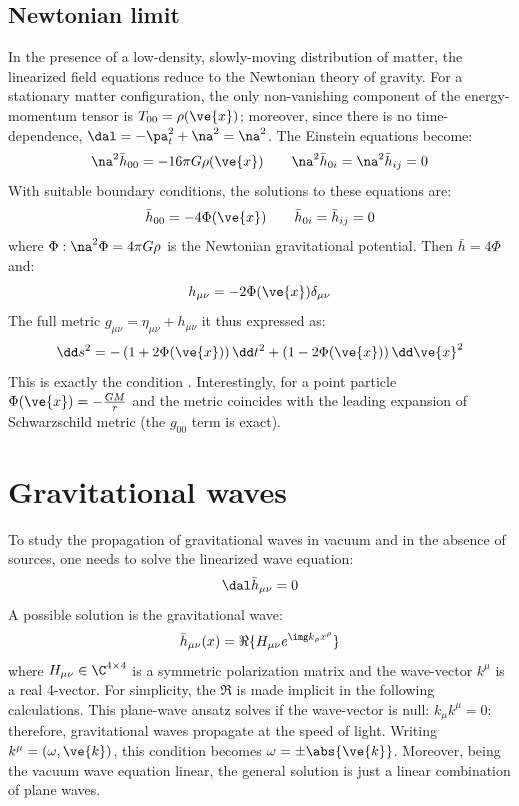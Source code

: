 \subsection{Newtonian limit}

In the presence of a low-density, slowly-moving distribution of matter, the linearized field equations reduce to the Newtonian theory of gravity. For a stationary matter configuration, the only non-vanishing component of the energy-momentum tensor is $ T_{00} = \rho(\ve{x}) $; moreover, since there is no time-dependence, $ \dal = -\pa_t^2 + \na^2 = \na^2 $. The Einstein equations become:
\begin{equation*}
  \na^2 \bar{h}_{00} = -16\pi G \rho(\ve{x})
  \qquad
  \na^2 \bar{h}_{0i} = \na^2 \bar{h}_{ij} = 0
\end{equation*}
With suitable boundary conditions, the solutions to these equations are:
\begin{equation*}
  \bar{h}_{00} = -4 \Phi(\ve{x})
  \qquad
  \bar{h}_{0i} = \bar{h}_{ij} = 0
\end{equation*}
where $ \Phi : \na^2 \Phi = 4\pi G \rho $ is the Newtonian gravitational potential. Then $ \bar{h} = 4 \Phi $ and:
\begin{equation*}
  h_{\mu \nu} = -2\Phi(\ve{x}) \delta_{\mu \nu}
\end{equation*}
The full metric $ g_{\mu \nu} = \eta_{\mu \nu} + h_{\mu \nu} $ it thus expressed as:
\begin{equation}
  \dd s^2 = - \left( 1 + 2\Phi(\ve{x}) \right) \dd t^2 + \left( 1 - 2\Phi(\ve{x}) \right) \dd\ve{x}^2
  \label{eq:linear-newtonian}
\end{equation}
This is exactly the condition .
Interestingly, for a point particle $ \Phi(\ve{x}) = - \frac{GM}{r} $ and the metric coincides with the leading expansion of Schwarzschild metric (the $ g_{00} $ term is exact).

\newpage
\section{Gravitational waves}

To study the propagation of gravitational waves in vacuum and in the absence of sources, one needs to solve the linearized wave equation:
\begin{equation}
  \dal \bar{h}_{\mu \nu} = 0
  \label{eq:wave}
\end{equation}
A possible solution is the gravitational wave:
\begin{equation}
  \bar{h}_{\mu \nu}(x) = \Re \{ H_{\mu \nu} e^{\img k_\rho x^\rho} \}
  \label{eq:wave-solution}
\end{equation}
where $ H_{\mu \nu} \in \C^{4 \times 4} $ is a symmetric polarization matrix and the wave-vector $ k^\mu $ is a real 4-vector. For simplicity, the $ \Re $ is made implicit in the following calculations. This plane-wave ansatz solves  if the wave-vector is null: $ k_\mu k^\mu = 0 $: therefore, gravitational waves propagate at the speed of light. Writing $ k^\mu = (\omega, \ve{k}) $, this condition becomes $ \omega = \pm \abs{\ve{k}} $. Moreover, being the vacuum wave equation linear, the general solution is just a linear combination of plane waves.

